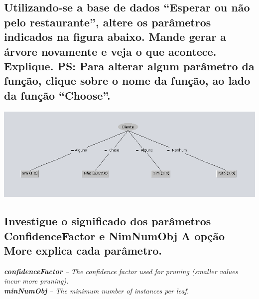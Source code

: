 \documentclass[12pt]{article}
\begin{document}
\subsection{Utilizando-se a base de dados “Esperar ou não pelo restaurante”, altere os
parâmetros indicados na figura abaixo. Mande gerar a árvore novamente e veja o
que acontece. Explique.
PS: Para alterar algum parâmetro da função, clique sobre o nome da função, ao
lado da função “Choose”.
}
\includegraphics[width=\linewidth]{./ibagens/vai-esperar.png}

\subsection{Investigue o significado dos parâmetros ConfidenceFactor e NimNumObj
A opção More explica cada parâmetro.
}
\textit{\textbf{confidenceFactor} -- The confidence factor used for pruning (smaller values incur more pruning).}\\
\textit{\textbf{minNumObj} -- The minimum number of instances per leaf.}
\end{document}
